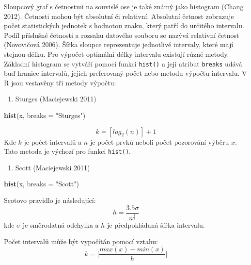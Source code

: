 \documentclass[12pt,]{article}
\newenvironment{Shaded}{\begin{snugshade}}{\end{snugshade}}
\newcommand{\KeywordTok}[1]{\textcolor[rgb]{0.13,0.29,0.53}{\textbf{#1}}}
\newcommand{\DataTypeTok}[1]{\textcolor[rgb]{0.13,0.29,0.53}{#1}}
\newcommand{\StringTok}[1]{\textcolor[rgb]{0.31,0.60,0.02}{#1}}
\newcommand{\NormalTok}[1]{#1}
\providecommand{\tightlist}{%
  \setlength{\itemsep}{0pt}\setlength{\parskip}{0pt}}
\begin{document}
\qquad Sloupcový graf s četnostmi na souvislé ose je také známý jako
histogram (Chang 2012). Četnosti mohou být absolutní či relativní.
Absolutní četnost zobrazuje počet statistických jednotek s hodnotou
znaku, který patří do určitého intervalu. Podíl příslušné četnosti a
rozsahu datového souboru se nazývá relativní četnost (Novovičová 2006).
Šířka sloupce reprezentuje jednotlivé intervaly, které mají stejnou
délku. Pro výpočet optimální délky intervalu existují různé metody.
Základní histogram se vytváří pomocí funkci \texttt{hist()} a její
atribut \texttt{breaks} udává buď hranice intervalů, jejich preferovaný
počet nebo metodu výpočtu intervalu. V R jsou vestavěny tři metody
výpočtu:

\newpage

\begin{enumerate}
\def\labelenumi{\arabic{enumi}.}
\tightlist
\item
  Sturges (Maciejewski 2011)
\end{enumerate}

\begin{Shaded}
\begin{Highlighting}[]
\KeywordTok{hist}\NormalTok{(x, }\DataTypeTok{breaks =} \StringTok{"Sturges"}\NormalTok{)}
\end{Highlighting}
\end{Shaded}

\[k=[log_2(n)]+1\] Kde \(k\) je počet intervalů a \(n\) je počet prvků
neboli počet pozorování výběru \(x\). Tato metoda je výchozí pro funkci
\texttt{hist()}.

\begin{enumerate}
\def\labelenumi{\arabic{enumi}.}
\setcounter{enumi}{1}
\tightlist
\item
  Scott (Maciejewski 2011)
\end{enumerate}

\begin{Shaded}
\begin{Highlighting}[]
\KeywordTok{hist}\NormalTok{(x, }\DataTypeTok{breaks =} \StringTok{"Scott"}\NormalTok{)}
\end{Highlighting}
\end{Shaded}

Scotovo pravidlo je následující:
\[h=\frac{3.5 \sigma}{n^{\frac{1}{3}}}\] kde \(\sigma\) je směrodatná
odchylka a \(h\) je předpokládaná šířka intervalu.

Počet intervalů může být vypočítán pomocí vztahu:
\[k=\Big[\frac{max(x)-min(x)}{h}\Big]\]
\end{document}
